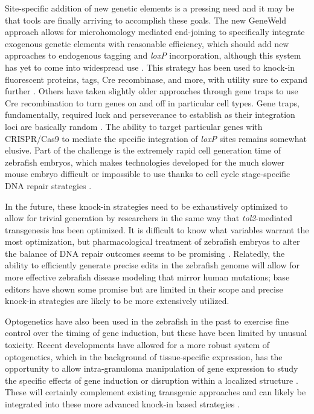 Site\hyp{}specific addition of new genetic elements is a pressing need and it may be that tools are finally arriving to accomplish these goals. The new GeneWeld approach allows for microhomology mediated end\hyp{}joining to specifically integrate exogenous genetic elements with reasonable efficiency, which should add new approaches to endogenous tagging and \textit{loxP} incorporation, although this system has yet to come into widespread use \citep{Wierson2020}. This strategy has been used to knock\hyp{}in fluorescent proteins, tags, Cre recombinase, and more, with utility sure to expand further \citep{Almeida2021, Liu2022a}. Others have taken slightly older approaches through gene traps to use Cre recombination to turn genes on and off in particular cell types. Gene traps, fundamentally, required luck and perseverance to establish as their integration loci are basically random \citep{Sugimoto2017}. The ability to target particular genes with CRISPR/Cas9 to mediate the specific integration of \textit{loxP} sites remains somewhat elusive. Part of the challenge is the extremely rapid cell generation time of zebrafish embryos, which makes technologies developed for the much slower mouse embryo difficult or impossible to use thanks to cell cycle stage\hyp{}specific DNA repair strategies \citep{Hustedt2016, Prill2020}.

In the future, these knock\hyp{}in strategies need to be exhaustively optimized to allow for trivial generation by researchers in the same way that \textit{tol2}\hyp{}mediated transgenesis has been optimized. It is difficult to know what variables warrant the most optimization, but pharmacological treatment of zebrafish embryos to alter the balance of DNA repair outcomes seems to be promising \citep{Nakade2014, Luo2018}. Relatedly, the ability to efficiently generate precise edits in the zebrafish genome will allow for more effective zebrafish disease modeling that mirror human mutations; base editors have shown some promise but are limited in their scope and precise knock\hyp{}in strategies are likely to be more extensively utilized. 

Optogenetics have also been used in the zebrafish in the past to exercise fine control over the timing of gene induction, but these have been limited by unusual toxicity. Recent developments have allowed for a more robust system of optogenetics, which in the background of tissue\hyp{}specific expression, has the opportunity to allow intra\hyp{}granuloma manipulation of gene expression to study the specific effects of gene induction or disruption within a localized structure \citep{Deisseroth2015}. These will certainly complement existing transgenic approaches and can likely be integrated into these more advanced knock\hyp{}in based strategies \citep{Reade2017}.


